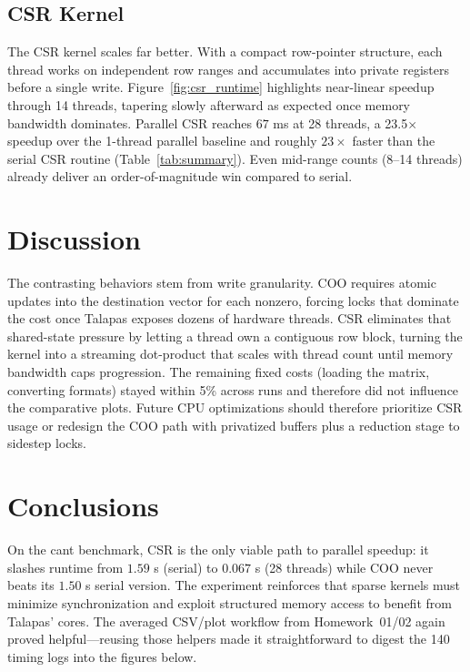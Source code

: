 \documentclass[11pt]{article}
\begin{document}
\subsection{CSR Kernel}
The CSR kernel scales far better. With a compact row-pointer structure, each thread works on independent row ranges and accumulates into private registers before a single write. Figure~\ref{fig:csr_runtime} highlights near-linear speedup through 14 threads, tapering slowly afterward as expected once memory bandwidth dominates. Parallel CSR reaches $67$ ms at 28 threads, a 23.5$\times$ speedup over the 1-thread parallel baseline and roughly $23\times$ faster than the serial CSR routine (Table~\ref{tab:summary}). Even mid-range counts (8--14 threads) already deliver an order-of-magnitude win compared to serial.

\section{Discussion}
The contrasting behaviors stem from write granularity. COO requires atomic updates into the destination vector for each nonzero, forcing locks that dominate the cost once Talapas exposes dozens of hardware threads. CSR eliminates that shared-state pressure by letting a thread own a contiguous row block, turning the kernel into a streaming dot-product that scales with thread count until memory bandwidth caps progression. The remaining fixed costs (loading the matrix, converting formats) stayed within 5\% across runs and therefore did not influence the comparative plots. Future CPU optimizations should therefore prioritize CSR usage or redesign the COO path with privatized buffers plus a reduction stage to sidestep locks.

\section{Conclusions}
On the cant benchmark, CSR is the only viable path to parallel speedup: it slashes runtime from $1.59$ s (serial) to $0.067$ s (28 threads) while COO never beats its $1.50$ s serial version. The experiment reinforces that sparse kernels must minimize synchronization and exploit structured memory access to benefit from Talapas' cores. The averaged CSV/plot workflow from Homework~01/02 again proved helpful---reusing those helpers made it straightforward to digest the 140 timing logs into the figures below.
\end{document}
